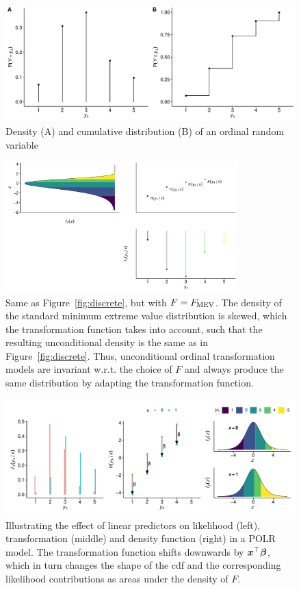\documentclass[article,nojss,shortnames]{jss}\usepackage[]{graphicx}\usepackage[]{color}
\begin{document}
\begin{figure}
\centering
\includegraphics[width=1\textwidth]{figures/figure0}
\caption{Density (A) and cumulative distribution (B) of an ordinal random
variable} \label{fig:ordinal}
\end{figure}

\begin{figure}
\centering
\includegraphics[width=0.8\textwidth]{figures/discrete-cloglog}
\caption{Same as Figure~\ref{fig:discrete}, but with $F=F_{\operatorname{MEV}}$. The density of the
standard minimum extreme value distribution is skewed, which the transformation
function takes into account, such that the resulting unconditional density is the
same as in Figure~\ref{fig:discrete}. Thus, unconditional ordinal transformation
models are invariant w.r.t. the choice of $F$ and always produce the same
distribution by adapting the transformation function.} \label{fig:discrete-cloglog}
\end{figure}

\begin{figure}
\centering
\includegraphics[width=1\textwidth]{figures/conditional-polr}
\caption{Illustrating the effect of linear predictors on likelihood (left),
transformation (middle) and density function (right) in a POLR model.
The transformation function shifts downwards by $\boldsymbol x^\top\text{\boldmath$\beta$}$, which in turn changes
the shape of the cdf and the corresponding likelihood contributions as areas under
the density of $F$.} \label{fig:cpolr}
\end{figure}
\end{document}
